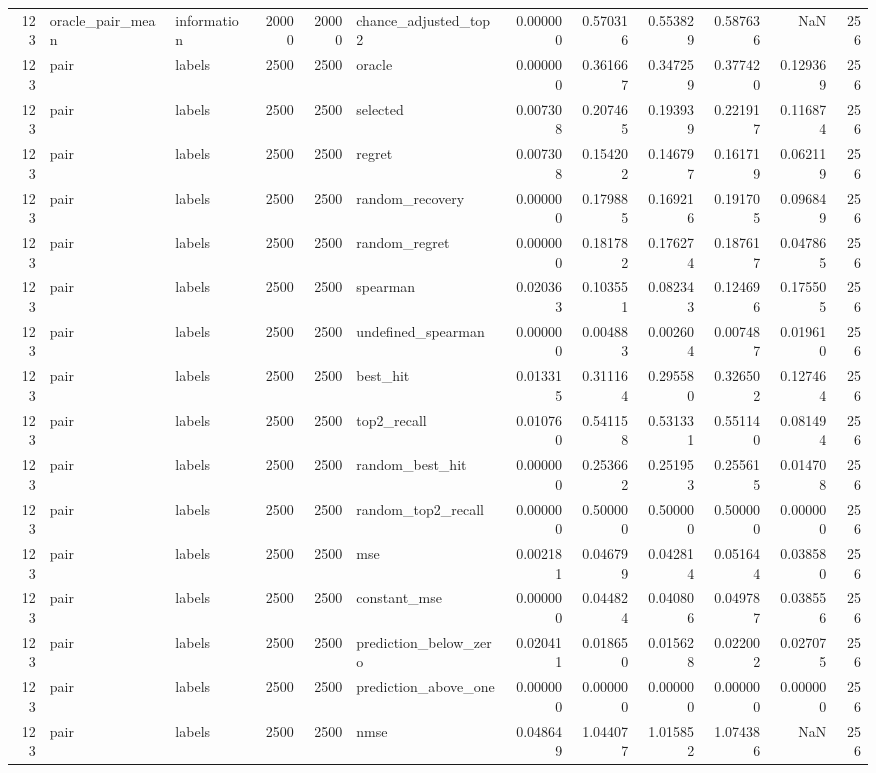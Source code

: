 \begin{tabular}{rllrrlrrrrrr}
123 & oracle_pair_mean & information & 20000 & 20000 & chance_adjusted_top2 & 0.000000 & 0.570316 & 0.553829 & 0.587636 & NaN & 256 \\
123 & pair & labels & 2500 & 2500 & oracle & 0.000000 & 0.361667 & 0.347259 & 0.377420 & 0.129369 & 256 \\
123 & pair & labels & 2500 & 2500 & selected & 0.007308 & 0.207465 & 0.193939 & 0.221917 & 0.116874 & 256 \\
123 & pair & labels & 2500 & 2500 & regret & 0.007308 & 0.154202 & 0.146797 & 0.161719 & 0.062119 & 256 \\
123 & pair & labels & 2500 & 2500 & random_recovery & 0.000000 & 0.179885 & 0.169216 & 0.191705 & 0.096849 & 256 \\
123 & pair & labels & 2500 & 2500 & random_regret & 0.000000 & 0.181782 & 0.176274 & 0.187617 & 0.047865 & 256 \\
123 & pair & labels & 2500 & 2500 & spearman & 0.020363 & 0.103551 & 0.082343 & 0.124696 & 0.175505 & 256 \\
123 & pair & labels & 2500 & 2500 & undefined_spearman & 0.000000 & 0.004883 & 0.002604 & 0.007487 & 0.019610 & 256 \\
123 & pair & labels & 2500 & 2500 & best_hit & 0.013315 & 0.311164 & 0.295580 & 0.326502 & 0.127464 & 256 \\
123 & pair & labels & 2500 & 2500 & top2_recall & 0.010760 & 0.541158 & 0.531331 & 0.551140 & 0.081494 & 256 \\
123 & pair & labels & 2500 & 2500 & random_best_hit & 0.000000 & 0.253662 & 0.251953 & 0.255615 & 0.014708 & 256 \\
123 & pair & labels & 2500 & 2500 & random_top2_recall & 0.000000 & 0.500000 & 0.500000 & 0.500000 & 0.000000 & 256 \\
123 & pair & labels & 2500 & 2500 & mse & 0.002181 & 0.046799 & 0.042814 & 0.051644 & 0.038580 & 256 \\
123 & pair & labels & 2500 & 2500 & constant_mse & 0.000000 & 0.044824 & 0.040806 & 0.049787 & 0.038556 & 256 \\
123 & pair & labels & 2500 & 2500 & prediction_below_zero & 0.020411 & 0.018650 & 0.015628 & 0.022002 & 0.027075 & 256 \\
123 & pair & labels & 2500 & 2500 & prediction_above_one & 0.000000 & 0.000000 & 0.000000 & 0.000000 & 0.000000 & 256 \\
123 & pair & labels & 2500 & 2500 & nmse & 0.048649 & 1.044077 & 1.015852 & 1.074386 & NaN & 256 \\

\end{tabular}
